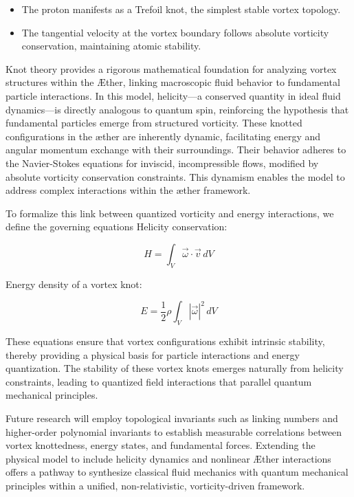 \documentclass[a4paper,10pt]{article}
\begin{document}
    \begin{itemize}
    \item The proton manifests as a Trefoil knot, the simplest stable vortex topology.
    \item The tangential velocity at the vortex boundary follows absolute vorticity conservation, maintaining atomic stability.
    \end{itemize}

    Knot theory provides a rigorous mathematical foundation for analyzing vortex structures within the \AE ther, linking macroscopic fluid behavior to fundamental particle interactions. In this model, helicity—a conserved quantity in ideal fluid dynamics—is directly analogous to quantum spin, reinforcing the hypothesis that fundamental particles emerge from structured vorticity. These knotted configurations in the æther are inherently dynamic, facilitating energy and angular momentum exchange with their surroundings. Their behavior adheres to the Navier-Stokes equations for inviscid, incompressible flows, modified by absolute vorticity conservation constraints. This dynamism enables the model to address complex interactions within the æther framework.

    To formalize this link between quantized vorticity and energy interactions, we define the governing equations Helicity conservation:

        \begin{equation}
            H = \int_V \vec{\omega} \cdot \vec{v} \, dV
        \end{equation}

    Energy density of a vortex knot:

        \begin{equation}
            E = \frac{1}{2} \rho \int_V |\vec{\omega}|^2 \, dV
        \end{equation}

    These equations ensure that vortex configurations exhibit intrinsic stability, thereby providing a physical basis for particle interactions and energy quantization. The stability of these vortex knots emerges naturally from helicity constraints, leading to quantized field interactions that parallel quantum mechanical principles.

    Future research will employ topological invariants such as linking numbers and higher-order polynomial invariants to establish measurable correlations between vortex knottedness, energy states, and fundamental forces. Extending the physical model to include helicity dynamics and nonlinear \AE ther interactions offers a pathway to synthesize classical fluid mechanics with quantum mechanical principles within a unified, non-relativistic, vorticity-driven framework.
\end{document}
